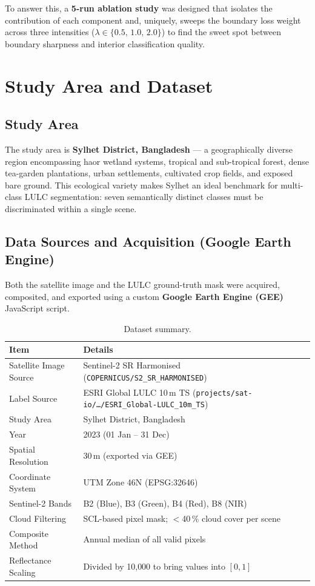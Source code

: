 \documentclass[12pt,a4paper]{article}
\begin{document}
To answer this, a \textbf{5-run ablation study} was designed that isolates
the contribution of each component and, uniquely, sweeps the boundary loss
weight across three intensities ($\lambda \in \{0.5,\,1.0,\,2.0\}$) to
find the sweet spot between boundary sharpness and interior classification
quality.

\section{Study Area and Dataset}

\subsection{Study Area}

The study area is \textbf{Sylhet District, Bangladesh} — a geographically
diverse region encompassing haor wetland systems, tropical and sub-tropical
forest, dense tea-garden plantations, urban settlements, cultivated crop
fields, and exposed bare ground. This ecological variety makes Sylhet an
ideal benchmark for multi-class LULC segmentation: seven semantically
distinct classes must be discriminated within a single scene.

\subsection{Data Sources and Acquisition (Google Earth Engine)}

Both the satellite image and the LULC ground-truth mask were acquired,
composited, and exported using a custom \textbf{Google Earth Engine (GEE)}
JavaScript script.

\begin{table}[H]
\centering
\caption{Dataset summary.}
\begin{tabular}{ll}
\toprule
\textbf{Item} & \textbf{Details} \\
\midrule
Satellite Image Source & Sentinel-2 SR Harmonised (\texttt{COPERNICUS/S2\_SR\_HARMONISED}) \\
Label Source           & ESRI Global LULC 10\,m TS (\texttt{projects/sat-io/\ldots/ESRI\_Global-LULC\_10m\_TS}) \\
Study Area             & Sylhet District, Bangladesh \\
Year                   & 2023 (01 Jan -- 31 Dec) \\
Spatial Resolution     & 30\,m (exported via GEE) \\
Coordinate System      & UTM Zone 46N (EPSG:32646) \\
Sentinel-2 Bands       & B2 (Blue), B3 (Green), B4 (Red), B8 (NIR) \\
Cloud Filtering        & SCL-based pixel mask; $<$40\,\% cloud cover per scene \\
Composite Method       & Annual median of all valid pixels \\
Reflectance Scaling    & Divided by 10{,}000 to bring values into $[0,1]$ \\
\bottomrule
\end{tabular}
\end{table}
\end{document}
